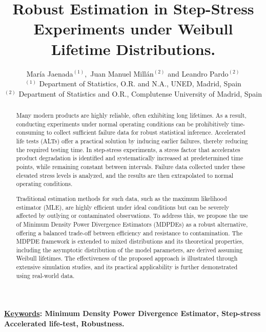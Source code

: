 \documentclass{article}
\begin{document}
\title{Robust Estimation in Step-Stress Experiments under Weibull Lifetime Distributions.}
\author{Mar\'{i}a Jaenada$^{(1)}, $ Juan Manuel Mill\'{a}n$^{(2)}$ and Leandro Pardo$^{(2)}$ \\
{\small $^{(1)}$ Department of Statistics, O.R. and N.A., UNED, Madrid, Spain}\\
{\small $^{(2)}$ Department of Statistics and O.R., Complutense University of Madrid, Spain}
}
\date{}
\maketitle


\begin{abstract}
	Many modern products are highly reliable, often exhibiting long lifetimes. As a result, conducting experiments under normal operating conditions can be prohibitively time-consuming to collect sufficient failure data for robust statistical inference. Accelerated life tests (ALTs) offer a practical solution by inducing earlier failures, thereby reducing the required testing time. In step-stress experiments, a stress factor that accelerates product degradation is identified and systematically increased at predetermined time points, while remaining constant between intervals. Failure data collected under these elevated stress levels is analyzed, and the results are then extrapolated to normal operating conditions.
	
	Traditional estimation methods for such data, such as the maximum likelihood estimator (MLE), are highly efficient under ideal conditions but can be severely affected by outlying or contaminated observations. To address this, we propose the use of Minimum Density Power Divergence Estimators (MDPDEs) as a robust alternative, offering a balanced trade-off between efficiency and resistance to contamination. The MDPDE framework is extended to mixed distributions and its theoretical properties, including the asymptotic distribution of the model parameters, are derived assuming Weibull lifetimes. The effectiveness of the proposed approach is illustrated through extensive simulation studies, and its practical applicability is further demonstrated using real-world data.
\end{abstract}

\noindent \underline{\textbf{Keywords}}\textbf{: Minimum Density Power Divergence Estimator, Step-stress Accelerated life-test, Robustness.}
\end{document}
